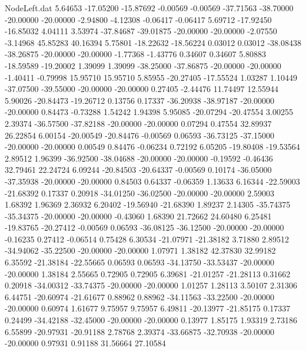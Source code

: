 \begin{filecontents}{NodeLeft.dat}
   5.64653  -17.05200  -15.87692    -0.00569   -0.00569  -37.71563  -38.70000  -20.00000  -20.00000   -2.94800   -4.12308   -0.06417   -0.06417
   5.69712  -17.92450  -16.85032     4.04111    3.53974  -37.84687  -39.01875  -20.00000  -20.00000   -2.07550   -3.14968   45.85283   40.16394
   5.75801  -18.22632  -18.56224     0.03012    0.03012  -38.08438  -38.26875  -20.00000  -20.00000   -1.77368   -1.43776    0.34607    0.34607
   5.80883  -18.59589  -19.20002     1.39099    1.39099  -38.25000  -37.86875  -20.00000  -20.00000   -1.40411   -0.79998   15.95710   15.95710
   5.85955  -20.27405  -17.55524     1.03287    1.10449  -37.07500  -39.55000  -20.00000  -20.00000    0.27405   -2.44476   11.74497   12.55944
   5.90026  -20.84473  -19.26712     0.13756    0.17337  -36.20938  -38.97187  -20.00000  -20.00000    0.84473   -0.73288    1.54242    1.94398
   5.95085  -20.07294  -20.47554     3.00255    2.39374  -36.57500  -37.82188  -20.00000  -20.00000    0.07294    0.47554   32.89937   26.22854
   6.00154  -20.00549  -20.84476    -0.00569    0.06593  -36.73125  -37.15000  -20.00000  -20.00000    0.00549    0.84476   -0.06234    0.72192
   6.05205  -19.80408  -19.53564     2.89512    1.96399  -36.92500  -38.04688  -20.00000  -20.00000   -0.19592   -0.46436   32.79461   22.24724
   6.09244  -20.84503  -20.64337    -0.00569    0.10174  -36.05000  -37.35938  -20.00000  -20.00000    0.84503    0.64337   -0.06359    1.13633
   6.16344  -22.59003  -21.68392     0.17337    0.20918  -34.01250  -36.02500  -20.00000  -20.00000    2.59003    1.68392    1.96369    2.36932
   6.20402  -19.56940  -21.68390     1.89237    2.14305  -35.74375  -35.34375  -20.00000  -20.00000   -0.43060    1.68390   21.72662   24.60480
   6.25481  -19.83765  -20.27412    -0.00569    0.06593  -36.08125  -36.12500  -20.00000  -20.00000   -0.16235    0.27412   -0.06514    0.75428
   6.30534  -21.07971  -21.38182     3.71880    2.89512  -34.94062  -35.22500  -20.00000  -20.00000    1.07971    1.38182   42.37830   32.99182
   6.35592  -21.38184  -22.55665     0.06593    0.06593  -34.13750  -33.53437  -20.00000  -20.00000    1.38184    2.55665    0.72905    0.72905
   6.39681  -21.01257  -21.28113     0.31662    0.20918  -34.00312  -33.74375  -20.00000  -20.00000    1.01257    1.28113    3.50107    2.31306
   6.44751  -20.60974  -21.61677     0.88962    0.88962  -34.11563  -33.22500  -20.00000  -20.00000    0.60974    1.61677    9.75957    9.75957
   6.49811  -20.13977  -21.85175     0.17337    0.24499  -34.42188  -32.45000  -20.00000  -20.00000    0.13977    1.85175    1.93319    2.73186
   6.55899  -20.97931  -20.91188     2.78768    2.39374  -33.66875  -32.70938  -20.00000  -20.00000    0.97931    0.91188   31.56664   27.10584

\end{filecontents}
